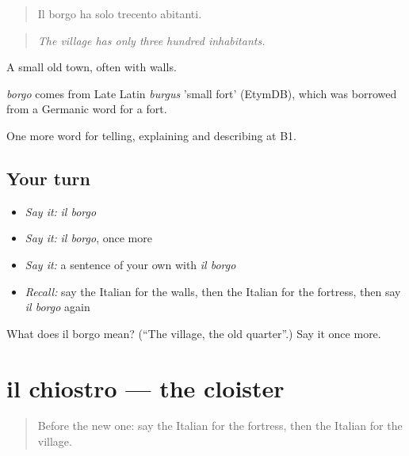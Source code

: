 \begin{quote}
Il borgo ha solo trecento abitanti.
\end{quote}

\begin{quote}
\emph{The village has only three hundred inhabitants.}
\end{quote}

A small old town, often with walls.

\begin{cousinweb}
\emph{borgo} comes from Late Latin \emph{burgus} 'small fort' (EtymDB), which was borrowed from a Germanic word for a fort.
\end{cousinweb}

\begin{grammarlens}[title={What you've built}]
One more word for telling, explaining and describing at B1.
\end{grammarlens}

\subsection*{Your turn}
\begin{itemize}
\raggedright
  \item \emph{Say it:} \emph{il borgo}
  \item \emph{Say it:} \emph{il borgo}, once more
  \item \emph{Say it:} a sentence of your own with \emph{il borgo}
  \item \emph{Recall:} say the Italian for the walls, then the Italian for the fortress, then say \emph{il borgo} again
\end{itemize}

\begin{tcolorbox}[breakable,colback=teal!4,colframe=teal!35!black,title={Before you move on}]
What does il borgo mean? (\textquotedblleft{}The village, the old quarter\textquotedblright{}.) Say it once more.
\end{tcolorbox}
\section[il chiostro]{il chiostro — the cloister}

\label{lesson:IT-C446-chiostro}



\begin{quote}
Before the new one: say the Italian for the fortress, then the Italian for the village.
\end{quote}

